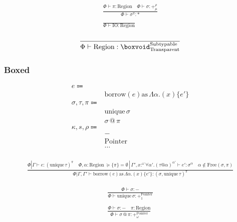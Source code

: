 \documentclass {article}
\begin{document}
\begin{gather*}
\frac
{\Phi \vdash \pi : \text{Region} \quad \Phi \vdash \sigma : +^\rho_\mu}
{\Phi \vdash \sigma^\pi : *} \\
\\
\frac
{}
{\Phi \vdash \text{IO} : \text{Region}}
\end{gather*}

\begin{gather*}
\frac
{}
{\Phi \vdash \text{Region} : \boxvoid^\text{Subtypable}_\text{Transparent}} \\
\end{gather*}

\subsubsection{Boxed}
\begin{align*}
e \Coloneqq & \\
& \text{borrow} (e) \text{as} \, \Lambda \alpha. (x) \{ e' \} \\
\sigma, \tau, \pi \Coloneqq & \\
& \text{unique} \, \sigma \\
& \sigma \, @ \, \pi \\
\kappa, s, \rho \Coloneqq & \\
& - \tag{Boxed} \\
& \text{Pointer} \tag{Pointer Representation} \\
& \dots \\
\end{align*}

\begin{gather*}
\frac
{\Phi | \Gamma \vdash e : (\text{unique} \, \tau)^\pi \quad \Phi,\alpha : \text{Region} \, \succeq \{ \pi \} = \emptyset \, | \, \Gamma', x :^\omega \forall \alpha'. (\tau @ \alpha)^{\alpha'} \vdash e' : \sigma^\alpha \quad \alpha \notin \text{Free}(\sigma, \pi)}
{\Phi | \Gamma, \Gamma' \vdash \text{borrow} (e) \text{as} \, \Lambda \alpha. (x) \{ e' \} : (\sigma, \text{unique} \, \tau)^\pi }
\end{gather*}

\begin{gather*}
\frac
{\Phi \vdash \sigma : -}
{\Phi \vdash \text{unique} \, \sigma : +^\text{Pointer}_1} \\
\\
\frac
{\Phi \vdash \sigma : - \quad \pi : \text{Region}}
{\Phi \vdash \sigma \, @ \, \pi : +^\text{Pointer}_\omega} 
\end{gather*}
\end{document}
